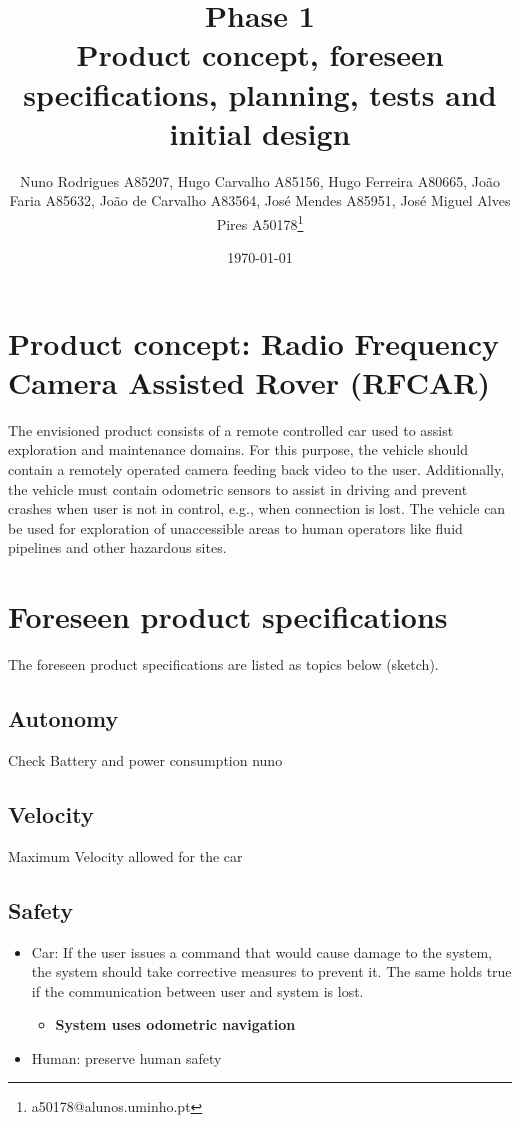 \documentclass[11pt]{article}
\author{Nuno Rodrigues A85207, Hugo Carvalho A85156, Hugo Ferreira A80665, João Faria A85632, João de Carvalho A83564, José Mendes A85951, José Miguel Alves Pires A50178\thanks{a50178@alunos.uminho.pt}}
\date{\today}
\title{Phase 1\\\medskip
\large Product concept, foreseen specifications, planning, tests and initial design}
\begin{document}
\maketitle
\tableofcontents


\section{Product concept: Radio Frequency Camera Assisted Rover (RFCAR)}
\label{sec:orgf4f2e51}
The envisioned product consists of a remote controlled car used to assist
exploration and maintenance domains. For this purpose, the vehicle should contain a
remotely operated camera feeding back video to the user. Additionally, the
vehicle must contain odometric sensors to assist in driving and prevent
crashes when user is not in control, e.g., when connection is lost.
The vehicle can be used for exploration of unaccessible areas to human operators
like fluid pipelines and other hazardous sites.

\section{Foreseen product specifications}
\label{sec:org942ed5c}
The foreseen product specifications are listed as topics below (sketch).

\subsection{Autonomy}
\label{sec:org7364ba5}
Check Battery and power consumption nuno
\subsection{Velocity}
\label{sec:orgb41b31b}
Maximum Velocity allowed for the car
\subsection{Safety}
\label{sec:org4323985}
\begin{itemize}
\item Car: If the user issues a command that would cause damage to the system, the
system should take corrective measures to prevent it. The same holds true if
the communication between user and system is lost.
\begin{itemize}
\item \textbf{System uses odometric navigation}
\end{itemize}
\item Human: preserve human safety
\end{itemize}
\end{document}
